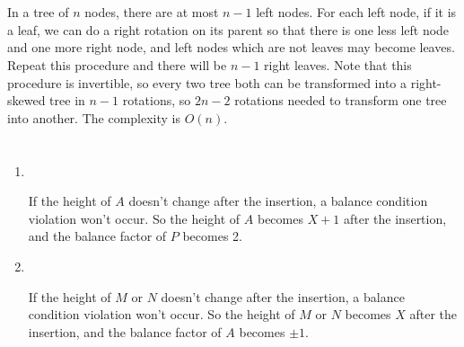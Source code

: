 \documentclass{article}
\begin{document}
\section{}
In a tree of $n$ nodes, there are at most $n-1$ left nodes. For each left node, if it is a leaf, we can do a right rotation on its parent so that there is one less left node and one more right node, and left nodes which are not leaves may become leaves. Repeat this procedure and there will be $n-1$ right leaves. Note that this procedure is invertible, so every two tree both can be transformed into a right-skewed tree in $n-1$ rotations, so $2n-2$ rotations needed to transform one tree into another. The complexity is $O(n)$.

\section{}
\begin{enumerate}
\item\
\begin{center}
\end{center}

If the height of $A$ doesn't change after the insertion, a balance condition violation won't occur. So the height of $A$ becomes $X+1$ after the insertion, and the balance factor of $P$ becomes 2.

\item\
\begin{center}
\end{center}

If the height of $M$ or $N$ doesn't change after the insertion, a balance condition violation won't occur. So the height of $M$ or $N$ becomes $X$ after the insertion, and the balance factor of $A$ becomes $\pm1$.

\end{enumerate}
\end{document}
